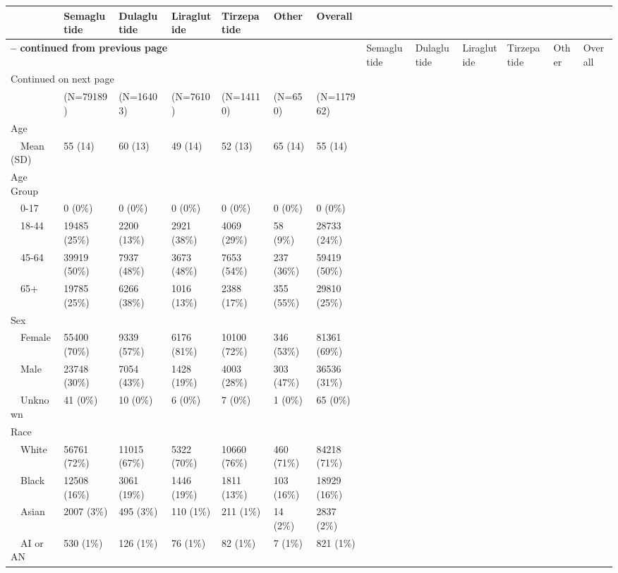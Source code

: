 \begin{longtable}{p{}p{}p{}p{}p{}p{}p{}}
   & Semaglutide & Dulaglutide & Liraglutide & Tirzepatide & Other & Overall \\ 
  \hline 
\endfirsthead 
\multicolumn{7}{p{\textwidth}}{{ \bfseries \tablename \thetable{} -- continued from previous page}} \ 
\hline Feature & Semaglutide & Dulaglutide & Liraglutide & Tirzepatide & Other & Overall \\ \hline 
\endhead 
\hline \multicolumn{7}{p{\textwidth}}{{Continued on next page}} \\ \hline 
\endfoot 
\hline 
\endlastfoot 
 \hline
 & (N=79189) & (N=16403) & (N=7610) & (N=14110) & (N=650) & (N=117962) \\ 
  Age &  &  &  &  &  &  \\ 
    Mean (SD) & 55 (14) & 60 (13) & 49 (14) & 52 (13) & 65 (14) & 55 (14) \\ 
  Age Group &  &  &  &  &  &  \\ 
    0-17 & 0 (0\%) & 0 (0\%) & 0 (0\%) & 0 (0\%) & 0 (0\%) & 0 (0\%) \\ 
    18-44 & 19485 (25\%) & 2200 (13\%) & 2921 (38\%) & 4069 (29\%) & 58 (9\%) & 28733 (24\%) \\ 
    45-64 & 39919 (50\%) & 7937 (48\%) & 3673 (48\%) & 7653 (54\%) & 237 (36\%) & 59419 (50\%) \\ 
    65+ & 19785 (25\%) & 6266 (38\%) & 1016 (13\%) & 2388 (17\%) & 355 (55\%) & 29810 (25\%) \\ 
  Sex &  &  &  &  &  &  \\ 
    Female & 55400 (70\%) & 9339 (57\%) & 6176 (81\%) & 10100 (72\%) & 346 (53\%) & 81361 (69\%) \\ 
    Male & 23748 (30\%) & 7054 (43\%) & 1428 (19\%) & 4003 (28\%) & 303 (47\%) & 36536 (31\%) \\ 
    Unknown & 41 (0\%) & 10 (0\%) & 6 (0\%) & 7 (0\%) & 1 (0\%) & 65 (0\%) \\ 
  Race &  &  &  &  &  &  \\ 
    White & 56761 (72\%) & 11015 (67\%) & 5322 (70\%) & 10660 (76\%) & 460 (71\%) & 84218 (71\%) \\ 
    Black & 12508 (16\%) & 3061 (19\%) & 1446 (19\%) & 1811 (13\%) & 103 (16\%) & 18929 (16\%) \\ 
    Asian & 2007 (3\%) & 495 (3\%) & 110 (1\%) & 211 (1\%) & 14 (2\%) & 2837 (2\%) \\ 
    AI or AN & 530 (1\%) & 126 (1\%) & 76 (1\%) & 82 (1\%) & 7 (1\%) & 821 (1\%) \\ 

\end{longtable}
